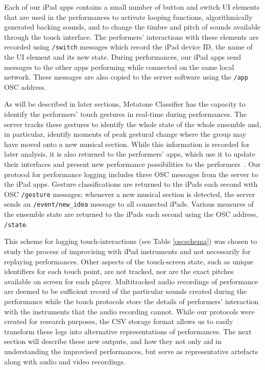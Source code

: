 \documentclass[graybox]{svmult}
\begin{document}
Each of our iPad apps contains a small number of button and switch UI
elements that are used in the performances to activate looping
functions, algorithmically generated backing sounds, and to change the
timbre and pitch of sounds available through the touch interface. The
performers' interactions with these elements are recorded using
\texttt{/switch} messages which record the iPad device ID, the name of
the UI element and its new state. During performances, our iPad apps
send messages to the other apps performing while connected on the same
local network. These messages are also copied to the server software
using the \texttt{/app} OSC address.

As will be described in later sections, Metatone Classifier has the
capacity to identify the performers' touch gestures in real-time
during performances. The server tracks these gestures to identify the
whole state of the whole ensemble and, in particular, identify moments
of peak gestural change where the group may have moved onto a new
musical section. While this information is recorded for later
analysis, it is also returned to the performers' apps, which use it to
update their interfaces and present new performance possibilities to
the performers~\cite{Martin:2015jk}. Our protocol for performance
logging includes three OSC messages from the server to the iPad apps.
Gesture classifications are returned to the iPads each second with OSC
\texttt{/gesture} messages; whenever a new musical section is
detected, the server sends an \texttt{/event/new\_idea} message to all
connected iPads. Various measures of the ensemble state are
returned to the iPads each second using the OSC address,
\texttt{/state}.

This scheme for logging touch-interactions (see Table \ref{oscschema})
was chosen to study the process of improvising with iPad instruments
and not necessarily for replaying performances. Other aspects of the
touch-screen state, such as unique identifiers for each touch point, are
not tracked, nor are the exact pitches available on screen for each
player. Multitracked audio recordings of performance are deemed to be
sufficient record of the particular sounds created during the
performance while the touch protocols store the details of performers'
interaction with the instruments that the audio recording cannot.
While our protocols were created for research purposes, the CSV
storage format allows us to easily transform these logs into
alternative representations of performances. The next section will
describe these new outputs, and how they not only aid in understanding
the improvised performances, but serve as representative artefacts
along with audio and video recordings.
\end{document}
